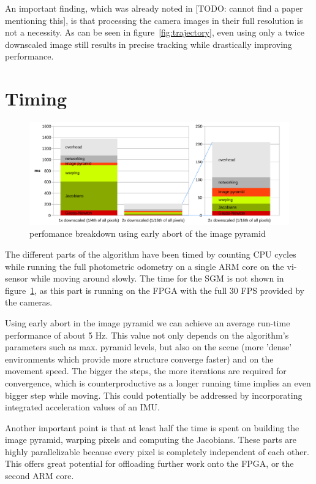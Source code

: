An important finding, which was already noted in [TODO: cannot find a paper
mentioning this], is that processing the camera images in their full resolution
is not a necessity. As can be seen in figure~\ref{fig:trajectory}, even using
only a twice downscaled image still results in precise tracking while
drastically improving performance.


\section{Timing}
\label{sec:timing}

\begin{figure}
    \centering
    \includegraphics[width=\textwidth]{images/timing.pdf}
    \caption{perfomance breakdown using early abort of the image pyramid}
    \label{fig:timing}
\end{figure}

The different parts of the algorithm have been timed by counting CPU cycles
while running the full photometric odometry on a single ARM core on the
vi-sensor while moving around slowly. The time for the SGM is not shown in
figure~\ref{fig:timing}, as this part is running on the FPGA with the full 30
FPS provided by the cameras.

Using early abort in the image pyramid we can achieve an average run-time
performance of about 5 Hz.
This value not only depends on the algorithm's parameters such as max. pyramid
levels, but also on the scene (more 'dense' environments which provide more
structure converge faster) and on the movement speed. The bigger the steps, the
more iterations are required for convergence, which is counterproductive as a
longer running time implies an even bigger step while moving. This could
potentially be addressed by incorporating integrated acceleration values of an
IMU.

Another important point is that at least half the time is spent on building the
image pyramid, warping pixels and computing the Jacobians. These parts are
highly parallelizable because every pixel is completely independent of each
other. This offers great potential for offloading further work onto the FPGA,
or the second ARM core.
